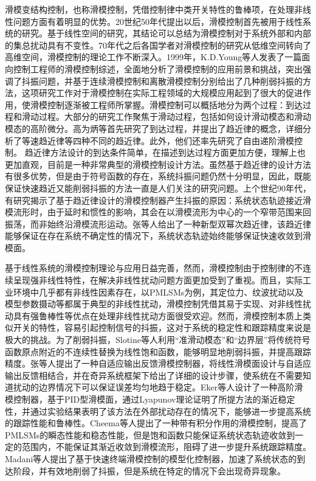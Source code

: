 滑模变结构控制，也称滑模控制，凭借控制律中类开关特性的鲁棒项，在处理非线性问题方面有着明显的优势。20世纪50年代提出以后，滑模控制首先被用于线性系统的研究。基于线性空间的研究，其结论可以总结为滑模控制对于系统外部和内部的集总扰动具有不变性\cite{刘金琨2005滑模变结构控制}。70年代之后各国学者对滑模控制的研究从低维空间转向了高维空间，滑模控制的理论工作不断深入。1999年，K.D.Young等人\cite{young1999control}发表了一篇面向控制工程师的滑模控制综述，全面地分析了滑模控制的应用前景和挑战，突出强调了抖振问题，并基于连续滑模控制和离散滑模控制分别给出了几种削弱抖振的方法，这项研究工作对于滑模控制在实际工程领域的大规模应用起到了很大的促进作用，使滑模控制逐渐被工程师所掌握。滑模控制可以概括地分为两个过程：到达过程和滑动过程。大部分的研究工作聚焦于滑动过程，包括如何设计滑动模态和滑动模态的高阶微分。高为炳等\cite{高为炳1996变结构控制的理论及设计方法}首先研究了到达过程，并提出了趋近律的概念，详细分析了等速趋近律等四种不同的趋近律。此外，他们还率先研究了自由递阶滑模控制。
趋近律方法设计的到达条件简单，在描述到达过程方面更加方便，理解上也更加直观，目前是一种非常典型的滑模控制设计方法。虽然基于趋近律的设计方法有很多优势，但是由于符号函数的存在，系统抖振问题仍然十分明显，因此，既能保证快速趋近又能削弱抖振的方法一直是人们关注的研究问题。上个世纪90年代，有研究揭示了基于趋近律设计的滑模控制器产生抖振的原因\cite{bartoszewicz1996remarks}：系统状态轨迹接近滑模流形时，由于延时和惯性的影响，其会在以滑模流形为中心的一个窄带范围来回振荡，而非始终沿滑模流形运动。张等人\cite{张合新2013一种新型滑模控制双幂次趋近律}给出了一种新型双幂次趋近律，该趋近律能够保证在存在系统不确定性的情况下，系统状态轨迹始终能够保证快速收敛到滑模面。

基于线性系统的滑模控制理论与应用日益完善，然而，滑模控制由于控制律的不连续呈现强非线性特性，在解决非线性扰动问题方面更加受到了重视。而且，实际工业环境中几乎都有非线性因素存在，以PMLSMs为例，其定位力、纹波扰动以及模型参数摄动等都属于典型的非线性扰动，滑模控制凭借其易于实现、对非线性扰动具有强鲁棒性等优点在处理非线性扰动方面很受欢迎\cite{shtessel2009guidance,eker2010second,utkin2013adaptive,cheema2017combined,madani2016modular,zhao2019adaptive,王一光0滑模变结构控制在扫描光刻系统中的应用研究}。然而，滑模控制本质上类似开关的特性，容易引起控制信号的抖振，这对于系统的稳定性和跟踪精度来说是极大的挑战\cite{tseng2010chattering}。为了削弱抖振，Slotine等人\cite{slotine1983tracking}利用“准滑动模态”和“边界层”将传统符号函数原点附近的不连续性替换为线性饱和函数，能够明显地削弱抖振，并提高跟踪精度。张等人\cite{zhang2013design}提出了一种自适应输出反馈滑模控制器，将线性滑模面设计与自适应输出反馈相结合，并在奇异系统框架下给出了详细的设计步骤，使系统在不需要知道扰动的边界情况下可以保证误差均匀地趋于稳定。Eker等人\cite{eker2010second}设计了一种高阶滑模控制器，基于PID型滑模面，通过Lyapunov理论证明了所提方法的渐近稳定性，并通过实验结果表明了该方法在外部扰动存在的情况下，能够进一步提高系统的跟踪性能和鲁棒性。Cheema等人\cite{cheema2017combined}提出了一种带有积分作用的滑模控制，提高了PMLSMs的瞬态性能和稳态性能，但是饱和函数只能保证系统状态轨迹收敛到一定的范围内，不能保证其渐近收敛到滑模流形，阻碍了进一步提升系统跟踪精度。Madani等人\cite{madani2016modular}提出了基于快速终端滑模控制的模型化控制器，加速了系统状态的到达阶段，并有效地削弱了抖振，但是系统在特定的情况下会出现奇异现象。

